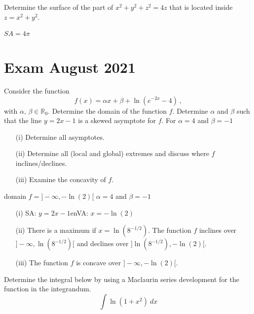 \begin{Exercise} Determine the surface of the part of $x^2+y^2+z^2=4z$ that is located inside $z=x^2+y^2$.
\end{Exercise}

\begin{Answer}
$SA = 4\pi$    
\end{Answer}





\section{Exam August 2021}
\begin{Exercise} Consider the function
$$
f(x)=\alpha x+\beta+\ln\left(e^{-2x}-4\right)\,,
$$
with $\alpha,\,\beta\in\mathbb{R}_0$.
\Question Determine the domain of the function $f$.
    \Question Determine $\alpha$ and $\beta$ such that the line $y=2x-1$ is a skewed asymptote for $f$.
    \Question For $\alpha=4$ and $\beta=-1$
    \begin{enumerate}
    \item[(i)] Determine all asymptotes.
    \item[(ii)] Determine all (local and global) extremes and discuss where $f$ inclines/declines.
    \item[(iii)] Examine the concavity of $f$.
    \end{enumerate}
\end{Exercise}


\begin{Answer}
\Question domain $f = ]-\infty,-\ln(2)[$
\Question $\alpha=4$ and $\beta=-1$
\Question \begin{enumerate}
    \item[(i)] SA: $y=2x-1$\qquad en\qquad VA: $x=-\ln(2)$
    \item[(ii)] There is a maximum if $x=\ln(8^{-1/2})$. The function $f$ inclines over $]-\infty , \ln(8^{-1/2})[$ and declines over $]\ln(8^{-1/2}) , -\ln(2)[$.
    \item[(iii)] The function $f$ is concave over $]-\infty , -\ln(2)[$.
    \end{enumerate}
  
\end{Answer}




\begin{Exercise} Determine the integral below by using a Maclaurin series development for the function in the integrandum. 
\[ \displaystyle \int \ln\left(1+x^2\right) \ dx \] 
\end{Exercise}

